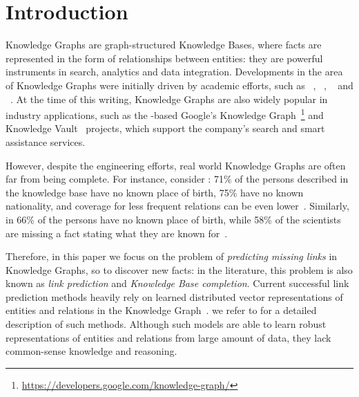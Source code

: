 
\section{Introduction} \label{sec:introduction}

%
Knowledge Graphs are graph-structured Knowledge Bases, where facts are represented in the form of relationships between entities: they are powerful instruments in search, analytics and data integration.
%
Developments in the area of Knowledge Graphs were initially driven by academic efforts, such as ~\cite{DBLP:conf/semweb/AuerBKLCI07}, ~\cite{DBLP:conf/aaai/BollackerCT07}, ~\cite{DBLP:conf/www/SuchanekKW07} and ~\cite{DBLP:conf/aaai/CarlsonBKSHM10}.
%
At the time of this writing, Knowledge Graphs are also widely popular in industry applications, such as the -based Google's Knowledge Graph~\footnote{\url{https://developers.google.com/knowledge-graph/}} and Knowledge Vault~\cite{DBLP:conf/kdd/0001GHHLMSSZ14} projects, which support the company's search and smart assistance services.
%

%
However, despite the engineering efforts, real world Knowledge Graphs are often far from being complete.
%
For instance, consider : 71\% of the persons described in the knowledge base have no known place of birth, 75\% have no known nationality, and coverage for less frequent relations can be even lower~\cite{DBLP:conf/kdd/0001GHHLMSSZ14}.
%
Similarly, in  66\% of the persons have no known place of birth, while 58\% of the scientists are missing a fact stating what they are known for~\cite{DBLP:conf/semweb/KrompassBT15}.
%

%
Therefore, in this paper we focus on the problem of \emph{predicting missing links} in Knowledge Graphs, so to discover new facts: in the literature, this problem is also known as \emph{link prediction} and \emph{Knowledge Base completion}.
%
Current successful link prediction methods heavily rely on learned distributed vector representations of entities and relations in the Knowledge Graph~\cite{DBLP:conf/www/NickelTK12,DBLP:conf/nips/BordesUGWY13,DBLP:conf/naacl/RiedelYMM13,yang15:embedding,DBLP:conf/icml/TrouillonWRGB16}.
%
we refer to \cite{DBLP:journals/pieee/Nickel0TG16} for a detailed description of such methods.
%
Although such models are able to learn robust representations of entities and relations from large amount of data, they lack common-sense knowledge and reasoning.
%

